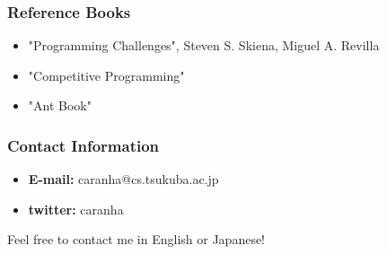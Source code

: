 \documentclass{beamer}
\begin{document}
\begin{frame}
    \frametitle{Reference Books}
    \begin{itemize}
        \item "Programming Challenges", Steven S. Skiena, Miguel A. Revilla
        \item "Competitive Programming"
        \item "Ant Book"
    \end{itemize}
\end{frame}

\begin{frame}
    \frametitle{Contact Information}
    \begin{itemize}
    \item {\bf E-mail:} caranha@cs.tsukuba.ac.jp
    \item {\bf twitter:} caranha
    \end{itemize}

    \bigskip
    
    Feel free to contact me in English or Japanese!    
\end{frame}
\end{document}
